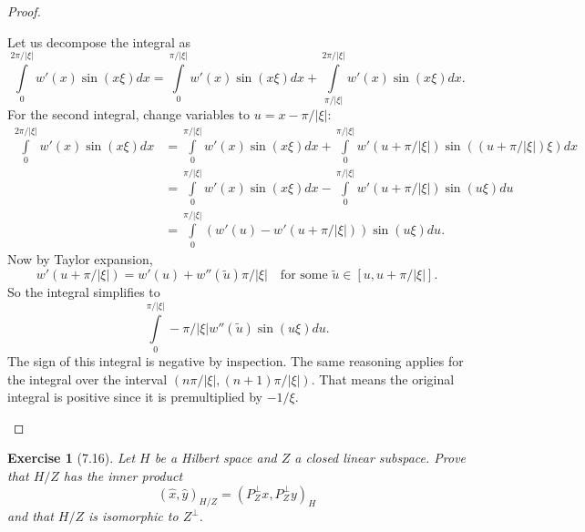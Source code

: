 \documentclass[letterpaper,twoside,11pt]{article}
\theoremstyle{mystyle}
\newtheorem*{exercise}{Exercise}
\begin{document}
\begin{proof}
\begin{enumerate}
    Let us decompose the integral as
    \[\int\limits_0^{2\pi /\left| \xi  \right|} {w'\left( x \right)\sin \left( {x\xi } \right)dx}  = \int\limits_0^{\pi /\left| \xi  \right|} {w'\left( x \right)\sin \left( {x\xi } \right)dx}  + \int\limits_{\pi /\left| \xi  \right|}^{2\pi /\left| \xi  \right|} {w'\left( x \right)\sin \left( {x\xi } \right)dx} .\]
    For the second integral, change variables to $u = x- \pi/|\xi|$: 
    \begin{align*}
    \int\limits_0^{2\pi /\left| \xi  \right|} {w'\left( x \right)\sin \left( {x\xi } \right)dx}  &= \int\limits_0^{\pi /\left| \xi  \right|} {w'\left( x \right)\sin \left( {x\xi } \right)dx}  + \int\limits_{0}^{\pi /\left| \xi  \right|} {w'\left( u+\pi/|\xi|\right)\sin \left( {(u+\pi/|\xi|)\xi } \right)dx} \\
    &=\int\limits_0^{\pi /\left| \xi  \right|} {w'\left( x \right)\sin \left( {x\xi } \right)dx}  - \int\limits_{0}^{\pi /\left| \xi  \right|} {w'\left( u+\pi/|\xi|\right)\sin (u\xi)du} \\
    &=\int\limits_0^{\pi /\left| \xi  \right|} \left({w'\left( u \right)}  -  w'\left( u+\pi/|\xi|\right)\right)\sin (u\xi)du.
    \end{align*}
    Now by Taylor expansion, 
    \[w'\left( u + \pi/|\xi| \right) = w'(u) + w''(\tilde u) \pi/|\xi|\quad \text{for some } \tilde u \in [u, u+\pi/|\xi|]. \]
    So the integral simplifies to 
    \[\int\limits_0^{\pi /\left| \xi  \right|} -\pi/|\xi|w''\left( \tilde u \right)\sin (u\xi)du.\]
    The sign of this integral is negative by inspection. The same reasoning applies for the integral over the interval $(n\pi/|\xi|, (n+1)\pi/|\xi|)$. That means the original integral is positive since it is premultiplied by $-1/\xi$. 

  \end{enumerate}
\end{proof}












\begin{exercise}[7.16]
  Let $H$ be a Hilbert space and $Z$ a closed linear subspace. Prove that $H/Z$ has the inner product 
  \[\left( \hat x, \hat y \right)_{H/Z} = \left( P_Z^{\perp} x,P_Z^{\perp} y  \right)_H\]
  and that $H/Z$ is isomorphic to $Z^\perp$.
\end{exercise}
\end{document}
